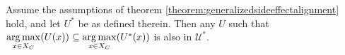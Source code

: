 \newcommand{\propUstarnotunique}{Assume the assumptions of theorem \ref{theorem:generalizedsideeffectalignment} hold, and let $U^*$ be as defined therein. Then any $U$ such that $\argmax\limits_{x\in X_C}(U(x))\subseteq \argmax\limits_{x\in X_C}(U^*(x))$ is also in $\mathcal U^*$.}
\begin{proposition}\label{prop:Ustarnotunique}
	\propUstarnotunique
\end{proposition}


\newcommand{\theoremneverfullyaligned}{For any $U\in \mathcal U^*$ there is a $\tilde U\in \mathcal U^*$ that is not a linear transformation of $U$.}

